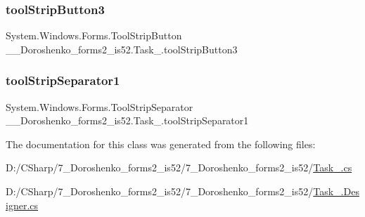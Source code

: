 \hypertarget{class__7___doroshenko__forms2__is52_1_1_task__3_ac3829d4753dd356088f5b0934ed9a168}{}\label{class__7___doroshenko__forms2__is52_1_1_task__3_ac3829d4753dd356088f5b0934ed9a168} 
\subsubsection{\texorpdfstring{tool\+Strip\+Button3}{toolStripButton3}}
{\footnotesize\ttfamily System.\+Windows.\+Forms.\+Tool\+Strip\+Button \+\_\+\_\+\+Doroshenko\+\_\+forms2\+\_\+is52.\+Task\+\_.\+tool\+Strip\+Button3\hspace{0.3cm}{\ttfamily [protected]}}

\hypertarget{class__7___doroshenko__forms2__is52_1_1_task__3_a76bb1982fc89d07002bd756087639c6f}{}\label{class__7___doroshenko__forms2__is52_1_1_task__3_a76bb1982fc89d07002bd756087639c6f} 
\subsubsection{\texorpdfstring{tool\+Strip\+Separator1}{toolStripSeparator1}}
{\footnotesize\ttfamily System.\+Windows.\+Forms.\+Tool\+Strip\+Separator \+\_\+\_\+\+Doroshenko\+\_\+forms2\+\_\+is52.\+Task\+\_.\+tool\+Strip\+Separator1\hspace{0.3cm}{\ttfamily [private]}}



The documentation for this class was generated from the following files\+:\begin{DoxyCompactItemize}
\item 
D\+:/\+C\+Sharp/7\+\_\+\+Doroshenko\+\_\+forms2\+\_\+is52/7\+\_\+\+Doroshenko\+\_\+forms2\+\_\+is52/\hyperlink{_task__3_8cs}{Task\+\_.\+cs}\item 
D\+:/\+C\+Sharp/7\+\_\+\+Doroshenko\+\_\+forms2\+\_\+is52/7\+\_\+\+Doroshenko\+\_\+forms2\+\_\+is52/\hyperlink{_task__3_8_designer_8cs}{Task\+\_.\+Designer.\+cs}\end{DoxyCompactItemize}
